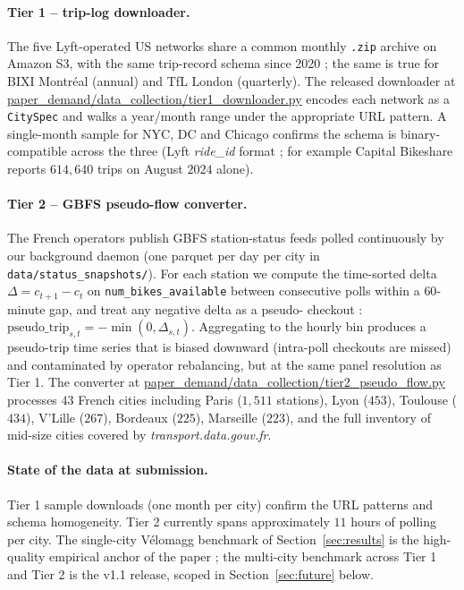 \documentclass[11pt,a4paper]{article}
\begin{document}
\paragraph{Tier 1 -- trip-log downloader.}
The five Lyft-operated US networks share a common monthly
\texttt{.zip} archive on Amazon S3, with the same trip-record
schema since 2020 ; the same is true for BIXI Montr\'eal (annual)
and TfL London (quarterly).  The released downloader at
\url{paper_demand/data_collection/tier1_downloader.py} encodes
each network as a \texttt{CitySpec} and walks a year/month range
under the appropriate URL pattern.  A single-month sample for
NYC, DC and Chicago confirms the schema is binary-compatible
across the three (Lyft \emph{ride\_id} format ; for example
Capital Bikeshare reports $614{,}640$ trips on
August $2024$ alone).

\paragraph{Tier 2 -- GBFS pseudo-flow converter.}
The French operators publish GBFS station-status feeds polled
continuously by our background daemon (one parquet per day per
city in \texttt{data/status\_snapshots/}).  For each station we
compute the time-sorted delta $\Delta = c_{t+1} - c_{t}$ on
\texttt{num\_bikes\_available} between consecutive polls within a
$60$-minute gap, and treat any negative delta as a pseudo-
checkout : $\text{pseudo\_trip}_{s,t} = -\min(0, \Delta_{s,t})$.
Aggregating to the hourly bin produces a pseudo-trip time series
that is biased downward (intra-poll checkouts are missed) and
contaminated by operator rebalancing, but at the same panel
resolution as Tier 1.  The converter at
\url{paper_demand/data_collection/tier2_pseudo_flow.py} processes
$43$ French cities including Paris ($1{,}511$ stations), Lyon
($453$), Toulouse ($434$), V'Lille ($267$), Bordeaux ($225$),
Marseille ($223$), and the full inventory of mid-size cities
covered by \emph{transport.data.gouv.fr}.

\paragraph{State of the data at submission.}
Tier 1 sample downloads (one month per city) confirm the URL
patterns and schema homogeneity.  Tier 2 currently spans
approximately $11$ hours of polling per city.  The single-city
V\'elomagg benchmark of Section~\ref{sec:results} is the
high-quality empirical anchor of the paper ; the multi-city
benchmark across Tier 1 and Tier 2 is the v1.1 release, scoped
in Section~\ref{sec:future} below.
\end{document}
